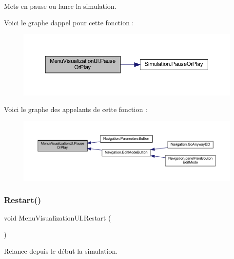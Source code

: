 Mets en pause ou lance la simulation. 

Voici le graphe d\textquotesingle{}appel pour cette fonction \+:\nopagebreak
\begin{figure}[H]
\begin{center}
\leavevmode
\includegraphics[width=350pt]{class_menu_visualization_u_i_a9affc75173b7b9e70340b2b934398464_cgraph}
\end{center}
\end{figure}
Voici le graphe des appelants de cette fonction \+:
\nopagebreak
\begin{figure}[H]
\begin{center}
\leavevmode
\includegraphics[width=350pt]{class_menu_visualization_u_i_a9affc75173b7b9e70340b2b934398464_icgraph}
\end{center}
\end{figure}
\mbox{\label{class_menu_visualization_u_i_ad71bfeae87aee9f53387e7abf59040c4}} 
\subsubsection{\texorpdfstring{Restart()}{Restart()}}
{\footnotesize\ttfamily void Menu\+Visualization\+U\+I.\+Restart (\begin{DoxyParamCaption}{ }\end{DoxyParamCaption})\hspace{0.3cm}{\ttfamily [inline]}}



Relance depuis le début la simulation. 

